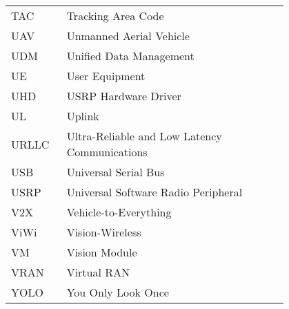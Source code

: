\begin{flushleft}
    \begin{tabular}{l p{0.8\linewidth}}

        TAC & Tracking Area Code \\
        UAV & Unmanned Aerial Vehicle \\
        UDM & Unified Data Management \\
        UE & User Equipment \\
        UHD & USRP Hardware Driver \\
        UL & Uplink \\
        URLLC & Ultra-Reliable and Low Latency Communications \\
        USB & Universal Serial Bus \\
        USRP & Universal Software Radio Peripheral \\
        V2X & Vehicle-to-Everything \\
        ViWi & Vision-Wireless \\
        VM & Vision Module \\
        VRAN & Virtual RAN \\
        YOLO & You Only Look Once \\

    \end{tabular}
\end{flushleft}


